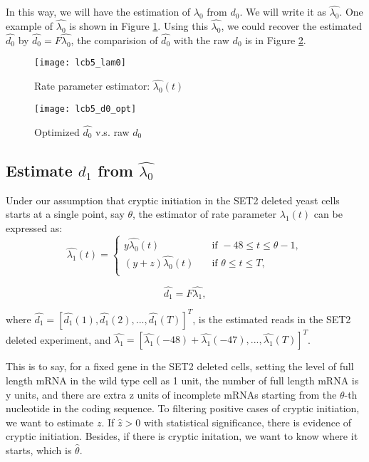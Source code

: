 \documentclass{article}
\begin{document}
In this way, we will have the estimation of $\lambda_0$ from $d_0$. We will write it as $\hat{\lambda_0}$. One example of  $\hat{\lambda_0}$ is shown in Figure \ref{lam0}. Using this $\hat{\lambda_0}$, we could recover the estimated $\hat{d_0}$ by $\hat{d_0} = F\hat{\lambda_0} $, the comparision of $\hat{d_0}$ with the raw $d_0$ is in Figure \ref{d0hat}.


\begin{figure}[h]
	\texttt{[image: lcb5\_lam0]}
	\caption{Rate parameter estimator: $\hat{\lambda_0}(t)$}
	\label{lam0}
\end{figure}

\begin{figure}[h]
	\texttt{[image: lcb5\_d0\_opt]}
	\caption{Optimized $\hat{d_0}$ v.s. raw $d_0$}
	\label{d0hat}
\end{figure}

\subsection{Estimate $d_1$ from $\hat{\lambda_0}$ }
Under our assumption that cryptic initiation in the SET2 deleted yeast cells starts at a single point, say $\theta$, the estimator of rate parameter $\lambda_1(t)$ can be expressed as:
\begin{equation}\label{lam1}
 \hat{\lambda_1}(t) =
\begin{cases}
y \hat{\lambda_0}(t)       & \quad \text{if } -48 \le t \le \theta-1, \\
(y+z) \hat{\lambda_0}(t)& \quad \text{if } \theta \le t \le T,\\
\end{cases}
\end{equation}

\begin{equation}\label{d1lam1}
\hat{d_1} = F \hat{\lambda_1},
\end{equation}

where $\hat{d_1} =[\hat{d_1}(1),\hat{d_1}(2),...,\hat{d_1}(T)]^T$, is the estimated reads in the SET2 deleted experiment, and $\hat{\lambda_1} = [\hat{\lambda_1}(-48) +\hat{\lambda_1}(-47),...,\hat{\lambda_1}(T)]^T$. 


This is to say, for a fixed gene in the SET2 deleted cells, setting the level of full length mRNA in the wild type cell as 1 unit,  the number of full length mRNA is y units, and there are extra z units of incomplete mRNAs starting from the $\theta$-th nucleotide in the coding sequence. To filtering positive cases of cryptic initiation, we want to estimate $z$. If $\hat{z}>0$ with statistical significance, there is evidence of cryptic initiation. Besides, if there is cryptic initation, we want to know where it starts, which is $\hat{\theta}$.
\end{document}
